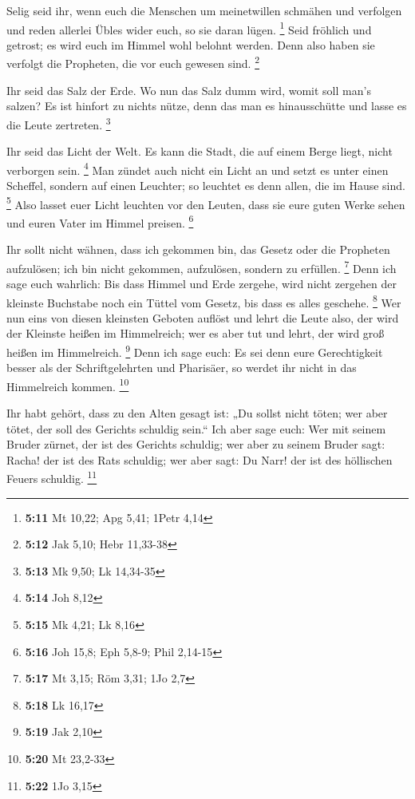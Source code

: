  Selig seid ihr, wenn euch die Menschen um meinetwillen
schmähen und verfolgen und reden allerlei Übles wider euch, so sie daran
lügen. \footnote{\textbf{5:11} Mt 10,22; Apg 5,41; 1Petr 4,14}
 Seid fröhlich und getrost; es wird euch im Himmel wohl
belohnt werden. Denn also haben sie verfolgt die Propheten, die vor euch
gewesen sind. \footnote{\textbf{5:12} Jak 5,10; Hebr 11,33-38}

 Ihr seid das Salz der Erde. Wo nun das Salz dumm wird,
womit soll man's salzen? Es ist hinfort zu nichts nütze, denn das man es
hinausschütte und lasse es die Leute zertreten. \footnote{\textbf{5:13}
  Mk 9,50; Lk 14,34-35}

 Ihr seid das Licht der Welt. Es kann die Stadt, die auf
einem Berge liegt, nicht verborgen sein. \footnote{\textbf{5:14} Joh
  8,12}  Man zündet auch nicht ein Licht an und setzt es
unter einen Scheffel, sondern auf einen Leuchter; so leuchtet es denn
allen, die im Hause sind. \footnote{\textbf{5:15} Mk 4,21; Lk 8,16}
 Also lasset euer Licht leuchten vor den Leuten, dass sie
eure guten Werke sehen und euren Vater im Himmel preisen. \footnote{\textbf{5:16}
  Joh 15,8; Eph 5,8-9; Phil 2,14-15}

 Ihr sollt nicht wähnen, dass ich gekommen bin, das
Gesetz oder die Propheten aufzulösen; ich bin nicht gekommen,
aufzulösen, sondern zu erfüllen. \footnote{\textbf{5:17} Mt 3,15; Röm
  3,31; 1Jo 2,7}  Denn ich sage euch wahrlich: Bis dass
Himmel und Erde zergehe, wird nicht zergehen der kleinste Buchstabe noch
ein Tüttel vom Gesetz, bis dass es alles geschehe. \footnote{\textbf{5:18}
  Lk 16,17}  Wer nun eins von diesen kleinsten Geboten
auflöst und lehrt die Leute also, der wird der Kleinste heißen im
Himmelreich; wer es aber tut und lehrt, der wird groß heißen im
Himmelreich. \footnote{\textbf{5:19} Jak 2,10}  Denn ich
sage euch: Es sei denn eure Gerechtigkeit besser als der
Schriftgelehrten und Pharisäer, so werdet ihr nicht in das Himmelreich
kommen. \footnote{\textbf{5:20} Mt 23,2-33}

 Ihr habt gehört, dass zu den Alten gesagt ist: „Du
sollst nicht töten; wer aber tötet, der soll des Gerichts schuldig
sein.``  Ich aber sage euch: Wer mit seinem Bruder
zürnet, der ist des Gerichts schuldig; wer aber zu seinem Bruder sagt:
Racha! der ist des Rats schuldig; wer aber sagt: Du Narr! der ist des
höllischen Feuers schuldig. \footnote{\textbf{5:22} 1Jo 3,15}

